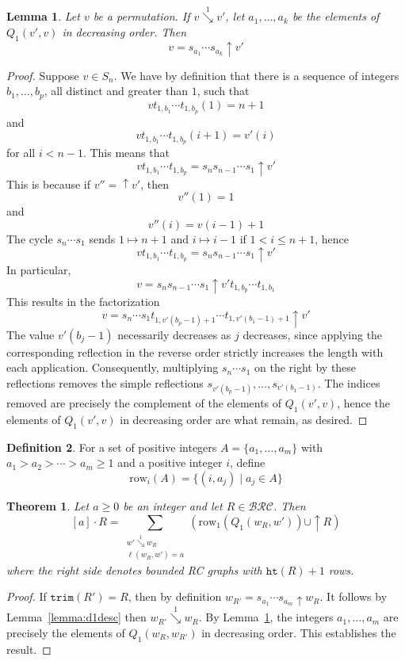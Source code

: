 \documentclass[a4paper,fleqn]{cas-sc}
\newtheorem{lemma}{Lemma}[subsection]
\newtheorem{theorem}{Theorem}[section]
\theoremstyle{definition}
\newtheorem{definition}[lemma]{Definition}
\theoremstyle{remark}
\numberwithin{equation}{subsection}
\newcommand{\shup}{{\uparrow}}
\newcommand{\downvar}[1]{\stackrel{#1}{\searrow}}
\newcommand{\wof}[1]{w_{#1}}
\newcommand{\trm}{\mathtt{trim}}
\newcommand{\hr}{\mathtt{ht}}
\newcommand{\BRC}{\mathcal{BRC}}
\begin{document}
\begin{lemma}\label{lemma:factor}
Let $v$ be a permutation. If $v\downvar{1} v'$, let $a_1,\ldots, a_k$ be the elements of $Q_1(v',v)$ in decreasing order. Then
$$v=s_{a_1}\cdots s_{a_k}\shup{v'}$$
\end{lemma}
\begin{proof}
	Suppose $v\in S_{n}$. We have by definition that there is a sequence of integers $b_1,\ldots,b_p$, all distinct and greater than $1$, such that
	$$vt_{1,b_1}\cdots t_{1, b_p}(1) = n + 1$$
	and
	$$vt_{1,b_1}\cdots t_{1, b_p}(i+1) = v'(i)$$
	for all $i<n-1$. This means that
	$$vt_{1,b_1}\cdots t_{1, b_p} = s_ns_{n-1}\cdots s_1\shup{v'}$$
	This is because if $v''=\shup{v'}$, then
	$$v''(1)=1$$
	and
	$$v''(i) = v(i-1)+1$$
	The cycle $s_n\cdots s_1$ sends $1\mapsto n+1$ and $i\mapsto i-1$ if $1<i\leq n+1$, hence
	$$vt_{1,b_1}\cdots t_{1, b_p} = s_ns_{n-1}\cdots s_1\shup{v'}$$
	In particular,
	$$v = s_ns_{n-1}\cdots s_1\shup{v'}t_{1,b_p}\cdots t_{1, b_1}$$
	This results in the factorization
	$$v = s_n\cdots s_1t_{1,v'(b_p-1)+1}\cdots t_{1,v'(b_1-1)+1}\shup{v'}$$
	The value $v'(b_j-1)$ necessarily decreases as $j$ decreases, since applying the corresponding reflection in the reverse order strictly increases the length with each application.  Consequently, multiplying $s_n\cdots s_1$ on the right by these reflections removes the simple reflections $s_{v'(b_p-1)},\ldots, s_{v'(b_1-1)}$. The indices removed are precisely the complement of the elements of $Q_1(v',v)$, hence the elements of $Q_1(v',v)$ in decreasing order are what remain, as desired.
\end{proof}

\begin{definition}
For a set of positive integers $A=\{a_1,\ldots, a_m\}$ with $a_1>a_2>\cdots > a_m\geq 1$ and a positive integer $i$, define
$$\mathrm{row}_i(A) = \{(i, a_j) \mid a_j\in A\}$$
\end{definition}

\begin{theorem} \label{theorem:modactrc}
Let $a\geq 0$ be an integer and let $R\in \BRC$. Then
$$[a]\cdot R = \sum_{\substack{w'\downvar{1}\wof{R}\\\ell(\wof{R},w')=a}} \left(\mathrm{row}_1(Q_1(\wof{R},w'))\cup \shup{R}\right)$$
where the right side denotes bounded RC graphs with $\hr(R)+1$ rows.
\end{theorem}
\begin{proof}
	If $\trm(R') = R$, then by definition $\wof{R'} = s_{a_1}\cdots s_{a_m}\shup \wof{R}$. It follows by Lemma~\ref{lemma:d1desc} then $\wof{R'}\downvar{1}\wof{R}$. By Lemma~\ref{lemma:factor}, the integers $a_1,\ldots, a_m$ are precisely the elements of $Q_1(\wof{R},\wof{R'})$ in decreasing order. This establishes the result.
\end{proof}
\end{document}
